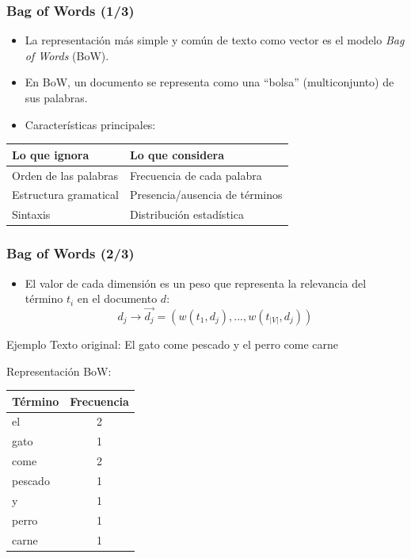 \documentclass[handout]{beamer}
\begin{document}
\begin{frame}\frametitle{Bag of Words (1/3)}
  \begin{itemize}
    \item La representación más simple y común de texto como vector es el modelo \emph{Bag of Words} (BoW).
    \item En BoW, un documento se representa como una ``bolsa'' (multiconjunto) de sus palabras.
    \item Características principales:
  \end{itemize}
  
  \hfill
  \begin{tabular}{|p{5cm}|p{5cm}|}
    \hline
    \textbf{Lo que ignora} & \textbf{Lo que considera} \\
    \hline
    Orden de las palabras & Frecuencia de cada palabra \\
    Estructura gramatical & Presencia/ausencia de términos \\
    Sintaxis & Distribución estadística \\
    \hline
  \end{tabular}
  \hfill
  \end{frame}

\begin{frame}\frametitle{Bag of Words (2/3)}
\begin{itemize}
   \item El valor de cada dimensión es un peso que representa la relevancia del término $t_{i}$ en el documento $d$:
   \begin{equation}
    d_{j} \rightarrow \overrightarrow{d_{j}}=(w(t_{1},d_{j}),...,w(t_{|V|},d_{j}))
   \end{equation}
\end{itemize}

\begin{block}{Ejemplo}
   Texto original: El gato come pescado y el perro come carne
   
   Representación BoW:
   \begin{table}[h]
    \centering
    \small
    \renewcommand{\arraystretch}{0.8}
    \begin{tabular}{|l|c|}
    \hline
    \textbf{Término} & \textbf{Frecuencia} \\
    \hline
    el     & 2 \\
    gato   & 1 \\
    come   & 2 \\
    pescado& 1 \\
    y      & 1 \\
    perro  & 1 \\
    carne  & 1 \\
    \hline
    \end{tabular}
    \end{table}
\end{block}
\end{frame}
\end{document}
